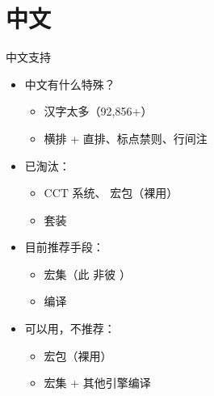 
\section{中文}
\begin{frame}{中文支持}
    \begin{itemize}
      \item 中文有什么特殊？\pause
  
        \begin{itemize}
          \item 汉字太多（92,856+）\pause
          \item 横排 + 直排、标点禁则、行间注 
        \end{itemize} \pause
  
      \item 已淘汰：
  
        \begin{itemize}
          \item CCT 系统、 宏包（裸用）
          \item \CTeX{} 套装
        \end{itemize} \pause
  
      \item 目前推荐手段：
  
        \begin{itemize}
          \item \alert{ 宏集}（此  非彼 \CTeX{}）
          \item \XeLaTeX{} 编译
        \end{itemize} \pause
  
      \item 可以用，不推荐：
  
        \begin{itemize}
          \item {} 宏包（裸用）
          \item {} 宏集 + 其他引擎编译
        \end{itemize}
    \end{itemize}
\end{frame}
  

